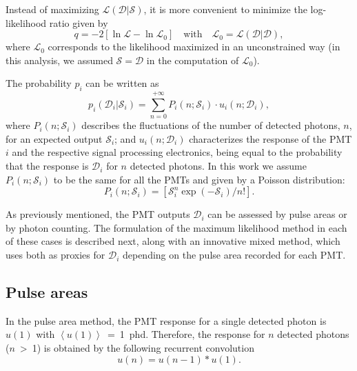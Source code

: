\documentclass[a4paper,11pt]{article}
\begin{document}
Instead of maximizing $\mathcal{L}\left( \mathcal{D} | \mathcal{S}\right)$, it is more convenient to minimize the  log-likelihood ratio \cite{logLikelihood} given by
\begin{equation}
{q} = -2\left[\ln\mathcal{L} - \ln\mathcal{L}_0\right] \quad
 \text{with} \quad \mathcal{L}_0 = \mathcal{L}\left(\mathcal{D}|\mathcal{D}\right),
 \label{LikelihoodRatio}
\end{equation}
where $\mathcal{L}_0$ corresponds to the likelihood maximized in an unconstrained way (in this analysis, we assumed $\mathcal{S}=\mathcal{D}$ in the computation of $\mathcal{L}_0$).

The probability $p_i$ can be written as
\begin{equation}
p_i\left(\mathcal{D}_i|\mathcal{S}_i\right)  =  \sum_{n=0}^{+\infty}P_i(n;\mathcal{S}_i) \cdot u_i(n;\mathcal{D}_i),
\end{equation}
where $P_i(n;\mathcal{S}_i)$ describes the fluctuations of the number of detected photons, $n$, for an expected output $\mathcal{S}_i$; and $u_i(n;\mathcal{D}_i)$ characterizes the response of the PMT $i$ and the respective signal processing electronics, being equal to the probability that the response is $\mathcal{D}_i$ for $n$ detected photons. In this work we assume $P_i(n;\mathcal{S}_i)$ to be the same for all the PMTs and given by a Poisson distribution:
\begin{equation}
P_i(n;\mathcal{S}_i) = \left[\mathcal{S}_i^n\exp(-\mathcal{S}_i)/n! \right].
\end{equation}

As previously mentioned, the PMT outputs $\mathcal{D}_i$ can be assessed by pulse areas or by photon counting. The formulation of the maximum likelihood method in each of these cases is described next, along with an innovative mixed method, which uses both as proxies for $\mathcal{D}_i$ depending on the pulse area recorded for each PMT.

\subsection{Pulse areas\label{subsection_pulse_areas}}

In the pulse area method, the PMT response for a single detected photon is  $u(1)$ with  $\left<u(1)\right>$~=~1~phd. Therefore, the response for $n$ detected photons ($n$~>~1) is obtained by the following recurrent convolution
\begin{equation}
	u(n) = u(n-1) \ast u(1).
  \label{multiplephotoelectronresponse}
\end{equation}
\end{document}
